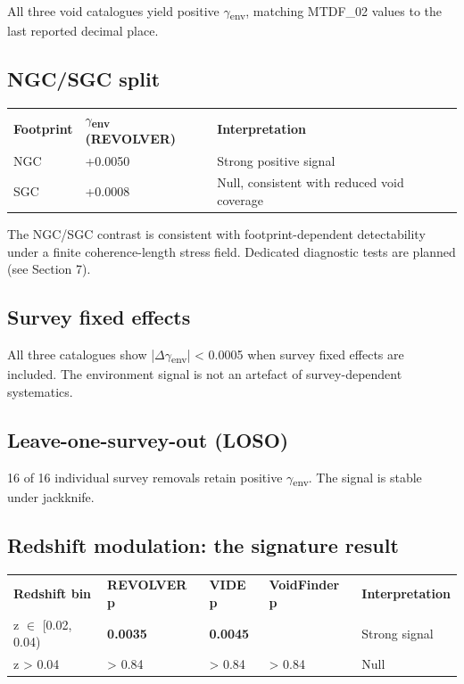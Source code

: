 \documentclass[11pt,a4paper]{article}
\begin{document}
All three void catalogues yield positive $\gamma$\textsubscript{env}, matching MTDF\_\allowbreak{}02 values to the last reported decimal place.

\subsection{NGC/\allowbreak{}SGC split}
\begin{table}[H]
\centering
\footnotesize
\begin{tabularx}{\linewidth}{l>{\RaggedRight\arraybackslash}X>{\RaggedRight\arraybackslash}X}
\toprule
\textbf{Footprint} & \textbf{$\gamma$\textsubscript{env} (REVOLVER)} & \textbf{Interpretation} \tabularnewline
NGC & +0.0050 & Strong positive signal \tabularnewline
SGC & +0.0008 & Null, consistent with reduced void coverage \tabularnewline
\bottomrule
\end{tabularx}
\end{table}

The NGC/\allowbreak{}SGC contrast is consistent with footprint-dependent detectability under a finite coherence-length stress field. Dedicated diagnostic tests are planned (see Section 7).

\subsection{Survey fixed effects}
All three catalogues show |$\Delta$$\gamma$\textsubscript{env}| < 0.0005 when survey fixed effects are included. The environment signal is not an artefact of survey-dependent systematics.

\subsection{Leave-one-survey-out (LOSO)}
16 of 16 individual survey removals retain positive $\gamma$\textsubscript{env}. The signal is stable under jackknife.

\subsection{Redshift modulation: the signature result}
\begin{table}[H]
\centering
\footnotesize
\begin{tabularx}{\linewidth}{l>{\RaggedRight\arraybackslash}X>{\RaggedRight\arraybackslash}X>{\RaggedRight\arraybackslash}X>{\RaggedRight\arraybackslash}X}
\toprule
\textbf{Redshift bin} & \textbf{REVOLVER p} & \textbf{VIDE p} & \textbf{VoidFinder p} & \textbf{Interpretation} \tabularnewline
z $\in$ [0.02, 0.04) & \textbf{0.0035} & \textbf{0.0045} & 0.06 & Strong signal \tabularnewline
z > 0.04 & > 0.84 & > 0.84 & > 0.84 & Null \tabularnewline
\bottomrule
\end{tabularx}
\end{table}
\end{document}
